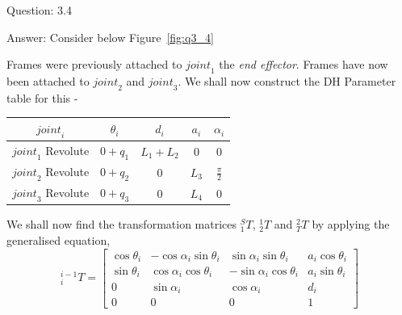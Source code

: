 \documentclass[a4paper]{article}
\begin{document}
\begin{qalist}
		\item[Question: 3.4] \setcounter{equation}{0} %
		\item[Answer:] Consider below Figure~\ref{fig:q3_4} \\
			\begin{minipage}{\linewidth}
				\vspace{0.5cm}
				\centering
				\label{fig:q3_4}
				\vspace{0.5cm}
			\end{minipage}
			Frames were previously attached to ${joint}_{1}$ the \textit{end effector}. Frames have now been attached to ${joint}_{2}$ and ${joint}_{3}$.
			We shall now construct the DH Parameter table for this - \\
			\begin{minipage}{\linewidth}
				\vspace{0.5cm}
				\centering
				\begin{tabular}{|c|c|c|c|c|}
					\hline
					${joint}_{i}$ & ${\theta}_{i}$ & ${d}_{i}$ & ${a}_{i}$ & ${\alpha}_{i}$\\
					\hline \hline
					${joint}_{1}$ Revolute & $0 + {q}_{1}$ & ${L}_{1} + {L}_{2}$ & $0$ & $0 $\\
					\hline
					${joint}_{2}$ Revolute & $0 + {q}_{2}$ & $0$ & ${L}_{3}$ & $\frac{\pi}{2}$\\
					\hline
					${joint}_{3}$ Revolute & $0 + {q}_{3}$ & $0$ & ${L}_{4}$ & $0 $\\
					\hline
				\end{tabular}
				\vspace{0.5cm}
			\end{minipage}		
			We shall now find the transformation matrices ${}^{S}_{1}T$, ${}^{1}_{2}T$ and ${}^{2}_{T}T$ by applying the generalised equation,
			\begin{equation}
				{}^{i-1}_{i}T = 
				\begin{bmatrix}
					\cos{\theta}_{i} & -\cos{\alpha}_{i}\sin{\theta}_{i} & \sin{\alpha}_{i}\sin{\theta}_{i} & {a}_{i}\cos{\theta}_{i} \\
					\sin{\theta}_{i} & \cos{\alpha}_{i}\cos{\theta}_{i} & -\sin{\alpha}_{i}\cos{\theta}_{i} & {a}_{i}\sin{\theta}_{i} \\
					0 & \sin{\alpha}_{i} & \cos{\alpha}_{i} & {d}_{i} \\
					0 & 0 & 0 & 1
				\end{bmatrix}
			\end{equation}
	

\end{qalist}
\end{document}
